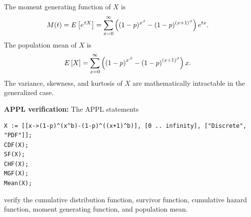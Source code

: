 \documentclass[12pt,fullpage]{article}
\begin{document}
\noindent
The moment generating function of $X$ is
$$
M(t) = E\left[ e ^ {\kern 0.08 em tX} \right] = \sum _{x = 0} ^ {\infty } \left( (1-p)^{x^{\beta}} - (1 - p)^{(x+1)^{\beta}} \right) e^{tx}.
$$
The population mean of $X$ is  
$$
E\left[ X \right] = \sum _{x = 0} ^ {\infty } \left( \left( 1 - p \right)  ^ {{x} ^ {\kern 0.08 em \beta}} - \left( 1 - p \right) ^ { \left( x + 1 \right) ^ {\beta}} \right) x.
$$
The variance, skewness, and kurtosis of $X$ are mathematically intractable in the generalized case.

\vspace{0.1in}

\noindent
{\bf APPL verification:}
The APPL statements
\begin{verbatim}
X := [[x->(1-p)^(x^b)-(1-p)^((x+1)^b)], [0 .. infinity], ["Discrete", "PDF"]];
CDF(X);
SF(X);
CHF(X);
MGF(X);
Mean(X);
\end{verbatim}
verify the cumulative distribution function, survivor function, cumulative hazard function, moment generating function, and population mean.
\end{document}
